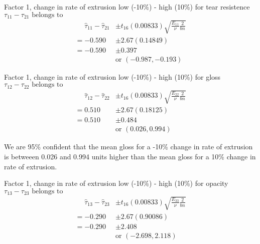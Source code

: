 \begin{enumerate}[label= (\alph*)]
    Factor 1, change in rate of extrusion low (-10\%) - high (10\%) for tear resistence \newline
    $\tau_{11} - \tau_{21}\text{ belongs to}$
    \begin{align*}
        \phantom{=}
        \hat{\tau}_{11} - \hat{\tau}_{21}
        & \pm
        t_{16}(0.00833)
        \sqrt{\frac{E_{11}}{\nu}\frac{2}{bn}}
        \\
        =
        -0.590
        & \pm
        2.67(0.14849)
        \\
        =
        -0.590
        & \pm
        0.397
        \\
        \phantom{\pm 0.590}
        &
        \text{or }
        (-0.987, -0.193)
    \end{align*}
    
    Factor 1, change in rate of extrusion low (-10\%) - high (10\%) for gloss \newline
    $\tau_{12} - \tau_{22}\text{ belongs to}$
    \begin{align*}
        \phantom{=}
        \hat{\tau}_{12} - \hat{\tau}_{22}
        & \pm
        t_{16}(0.00833)
        \sqrt{\frac{E_{22}}{\nu}\frac{2}{bn}}
        \\
        =
        0.510
        & \pm
        2.67(0.18125)
        \\
        =
        0.510
        & \pm
        0.484
        \\
        \phantom{\pm 0.590}
        &
        \text{or }
        (0.026, 0.994)
    \end{align*}

    We are 95\% confident that the mean gloss for a -10\% change in rate of extrusion is betweeen 0.026 and 0.994 units higher than the mean gloss for a 10\% change in rate of extrusion.
    
    Factor 1, change in rate of extrusion low (-10\%) - high (10\%) for opacity \newline
    $\tau_{13} - \tau_{23}\text{ belongs to}$
    \begin{align*}
        \phantom{=}
        \hat{\tau}_{13} - \hat{\tau}_{23}
        & \pm
        t_{16}(0.00833)
        \sqrt{\frac{E_{33}}{\nu}\frac{2}{bn}}
        \\
        =
        -0.290
        & \pm
        2.67(0.90086)
        \\
        =
        -0.290
        & \pm
        2.408
        \\
        \phantom{\pm 0.590}
        &
        \text{or }
        (-2.698, 2.118)
    \end{align*}
    

\end{enumerate}
